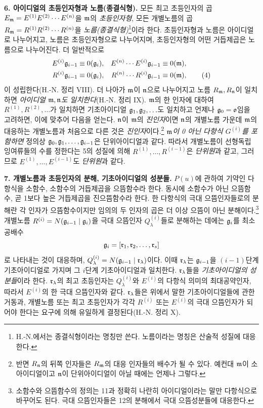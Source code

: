 \textbf{6. 아이디얼의 초등인자형과 노름(종결식형).} 모든 최고 초등인자의 곱 \(E_\mathfrak m=E^{(1)}E^{(2)}\cdots E^{(n)}\)을 \(\mathfrak m\)의 \emph{초등인자형}, 모든 개별노름의 곱 \(R_\mathfrak m=R^{(1)}R^{(2)}\cdots R^{(n)}\)을 \emph{노름(종결식형)}\footnote{H.-N.에서는 종결식형이라는 명칭만 쓴다. 노름이라는 명칭은 산술적 성질에 대응한다.}이라 한다. 초등인자형과 노름은 아이디얼로 나누어지고, 노름은 초등인자형으로 나누어지며, 초등인자형의 어떤 거듭제곱은 노름으로 나누어진다. 더 일반적으로
\begin{align}
 E^{(i)}\mathfrak g_{i-1}&\equiv0(\mathfrak g_i),
& E^{(n)}\cdots E^{(i)}\mathfrak g_{i-1}&\equiv0(\mathfrak m),\notag\\
 R^{(i)}\mathfrak g_{i-1}&\equiv0(\mathfrak g_i),
& R^{(n)}\cdots R^{(i)}\mathfrak g_{i-1}&\equiv0(\mathfrak m), \tag{4}
\end{align}
이 성립한다(H.-N. 정리 VIII). 더 나아가 \(\mathfrak m\)이 \(\mathfrak n\)으로 나누어지고 노름 \(R_\mathfrak m,R_\mathfrak n\)이 일치하면 \emph{아이디얼 \(\mathfrak m,\mathfrak n\)도 일치한다}(H.-N. 정리 IX). \(\mathfrak m\)의 한 인자에 대하여 \(R^{(1)},R^{(2)},\ldots\)가 일치하면 기초아이디얼 \(\mathfrak g_1,\mathfrak g_2,\ldots\)도 일치하고 언제나 \(\mathfrak g_0=\mathfrak o\)임을 고려하면, 이에 맞추어 다음을 얻는다. \(\mathfrak n\)이 \(\mathfrak m\)의 \emph{진인자}이면 \(\mathfrak n\)의 개별노름 가운데 \(\mathfrak m\)의 대응하는 개별노름과 처음으로 다른 것은 \emph{진인자}이다.\footnote{반면 \(R_\mathfrak n\)의 뒤쪽 인자들은 \(R_\mathfrak m\)의 대응 인자들의 배수가 될 수 있다. 예컨대 \(\mathfrak m\)이 소아이디얼이고 \(\mathfrak n\)이 단위아이디얼이 아닐 때에는 언제나 그렇다.} \emph{\(\mathfrak m\)이 0 아닌 다항식 \(G^{(i)}\)를 포함하면} 정의상 \(\mathfrak g_0,\mathfrak g_1,\ldots,\mathfrak g_{i-1}\)은 단위아이디얼과 같다. 따라서 개별노름이 선형독립 잉여류들의 수를 정한다는 5의 성질에 의해 \(R^{(1)},\ldots,R^{(i-1)}\)은 \emph{단위원}과 같고, 그러므로 \(E^{(1)},\ldots,E^{(i-1)}\)도 \emph{단위원}과 같다.

\textbf{7. 개별노름과 초등인자의 분해, 기초아이디얼의 성분들.} \(P(u)\)에 관하여 기약인 다항식을 소함수, 소함수의 거듭제곱을 으뜸함수라 한다. 동시에 소함수가 아닌 으뜸함수, 곧 1보다 높은 거듭제곱을 진으뜸함수라 한다. 한 다항식의 극대 으뜸인자들로의 분해란 각 인자가 으뜸함수이지만 임의의 두 인자의 곱은 더 이상 으뜸이 아닌 분해이다.\footnote{소함수와 으뜸함수의 정의는 11과 정확히 나란히 아이디얼이라는 말만 다항식으로 바꾸어도 된다. 극대 으뜸인자들은 12의 분해에서 극대 으뜸성분들에 대응한다.} 개별노름 \(R^{(i)}=N(\mathfrak g_{i-1}\mid\mathfrak g_i)\)을 극대 으뜸인자 \(Q_\lambda^{(i)}\)들로 분해하는 데에는 \(\mathfrak g_i\)를 최소공배수
\[
\mathfrak g_i=[\mathfrak r_1,\mathfrak r_2,\ldots,\mathfrak r_s]
\]
로 나타내는 것이 대응하며, \(Q_\lambda^{(i)}=N(\mathfrak g_{i-1}\mid\mathfrak r_\lambda)\)이다.
이때 \(\mathfrak r_\lambda\)는 \(\mathfrak g_{i-1}\)을 \((i-1)\)단계 기초아이디얼로 가지며 그 \(i\)단계 기초아이디얼과 일치한다. \(\mathfrak r_\lambda\)들을 \emph{기초아이디얼의 성분들}이라 한다. \(\mathfrak r_\lambda\)의 최고 초등인자는 \(Q_\lambda^{(i)}\)와 \(E^{(i)}\)의 다항식 의미의 최대공약인자, 따라서 \(E^{(i)}\)의 한 극대 으뜸인자와 같다. \(\mathfrak r_\lambda\)들은 위에서 말한 기초아이디얼들에 관한 거동과, 개별노름 또는 최고 초등인자가 각각 \(R^{(i)}\) 또는 \(E^{(i)}\)의 극대 으뜸인자가 되어야 한다는 요구에 의해 유일하게 결정된다(H.-N. 정리 X).


